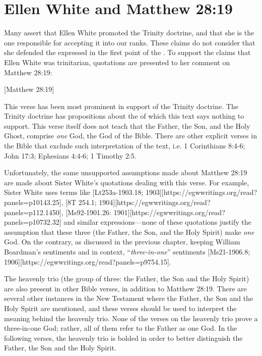 \chapter{Ellen White and Matthew 28:19}

Many assert that Ellen White promoted the Trinity doctrine, and that she is the one responsible for accepting it into our ranks. These claims do not consider that she defended the  expressed in the first point of the . To support the claims that Ellen White was trinitarian, quotations are presented to her comment on Matthew 28:19:

[Matthew 28:19]

This verse has been most prominent in support of the Trinity doctrine. The Trinity doctrine has propositions about the  of which this text says nothing to support. This verse itself does not teach that the Father, the Son, and the Holy Ghost, comprise \textit{one} God, the God of the Bible. There are other explicit verses in the Bible that exclude such interpretation of the text, i.e. 1 Corinthians 8:4-6; John 17:3; Ephesians 4:4-6; 1 Timothy 2:5.

Unfortunately, the same unsupported assumptions made about Matthew 28:19 are made about Sister White’s quotations dealing with this verse. For example, Sister White uses terms like [Lt253a-1903.18; 1903][https://egwwritings.org/read?panels=p10143.25], [8T 254.1; 1904][https://egwwritings.org/read?panels=p112.1450], [Ms92-1901.26: 1901][https://egwwritings.org/read?panels=p10732.32] and similar expressions—none of these quotations justify the assumption that these three (the Father, the Son, and the Holy Spirit) make \textit{one} God. On the contrary, as discussed in the previous chapter, keeping William Boardman’s sentiments and  in context, “\textit{three-in-one}” sentiments [Ms21-1906.8; 1906][https://egwwritings.org/read?panels=p9754.15].

The heavenly trio (the group of three: the Father, the Son and the Holy Spirit) are also present in other Bible verses, in addition to Matthew 28:19. There are several other instances in the New Testament where the Father, the Son and the Holy Spirit are mentioned, and these verses should be used to interpret the meaning behind the heavenly trio. None of the verses on the heavenly trio prove a three-in-one God; rather, all of them refer to the Father as one God. In the following verses, the heavenly trio is bolded in order to better distinguish the Father, the Son and the Holy Spirit.

